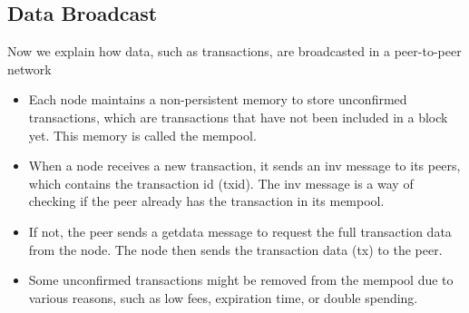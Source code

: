 \subsection{Data Broadcast}
Now we explain how data, such as transactions, are broadcasted in a peer-to-peer network
\begin{itemize}
	\item Each node maintains a non-persistent memory to store unconfirmed transactions, which are transactions that have not been included in a block yet. This memory is called the mempool.
	\item When a node receives a new transaction, it sends an inv message to its peers, which contains the transaction id (txid). The inv message is a way of checking if the peer already has the transaction in its mempool.
	\item If not, the peer sends a getdata message to request the full transaction data from the node. The node then sends the transaction data (tx) to the peer.
	\item Some unconfirmed transactions might be removed from the mempool due to various reasons, such as low fees, expiration time, or double spending.
\end{itemize}
